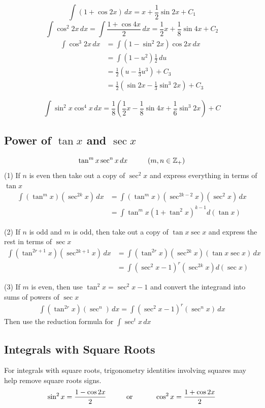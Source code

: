 \documentclass[12pt]{article}
\newcommand\tab[1][1cm]{\hspace*{#1}}
\begin{document}
\[
    \int (1 + \cos 2x) \, dx = x + \frac{1}{2} \sin 2x + C_1
\]
\[
    \int \cos^2 2x \, dx = \int \frac{1 + \cos 4x}{2} \, dx = \frac{1}{2}x + \frac{1}{8} \sin 4x + C_2 
\]
\begin{align*} 
    \int \cos^3 2x \, dx &= \int (1 - \sin^2 2x) \cos 2x \, dx \\
    &= \int (1 - u^2) \frac{1}{2} \, du \\
    &= \frac{1}{2} (u - \frac{1}{3}u^3) + C_3 \\
    &= \frac{1}{2} \left( \sin 2x - \frac{1}{3} \sin^3 2x \right) + C_3
\end{align*}

\[
    \int \sin^2 x \cos^4 x \, dx = \frac{1}{8} \left( \frac{1}{2}x - \frac{1}{8} \sin 4x + \frac{1}{6} \sin^3 2x \right) + C
\]

\subsection{Power of $\tan x$ and $\sec x$}
\[
    \tan^m x \sec^n x \, dx \textrm{\tab} (m, n \in \mathbb{Z}_{+})
\]
(1) If $n$ is even then take out a copy of $\sec^2 x$ and express everything in terms of $\tan x$
\begin{align*} 
    \int (\tan^m x)(\sec^{2k} x) \, dx &= \int (\tan^m x)(\sec^{2k - 2} x)(\sec^2 x) \, dx \\
    &= \int \tan^m x (1 + \tan^2 x)^{k - 1} d(\tan x)
\end{align*}

\noindent
(2) If $n$ is odd and $m$ is odd, then take out a copy of $\tan x \sec x$ and express the rest in terms of $\sec x$
\begin{align*} 
     \int (\tan^{2r + 1} x)(\sec^{2k + 1} x) \, dx &= \int (\tan^{2r} x)(\sec^{2k} x)(\tan x \sec x) \, dx \\ 
     &= \int (\sec^2 x - 1)^r (\sec^{2k} x) d(\sec x)
\end{align*}

\noindent
(3) If $m$ is even, then use $\tan^2 x = \sec^2 x - 1$ and convert the integrand into sums of powers of $\sec x$
\begin{align*} 
    \int (\tan^{2r} x)(\sec^n ) \, dx = \int (\sec^2 x - 1)^r (\sec^n x) \, dx
\end{align*}
Then use the reduction formula for $\int \sec^t x \, dx$

\subsection{Integrals with Square Roots}
For integrals with square roots, trigonometry identities involving squares may help remove square roots signs. 
\[
    \sin^2 x = \frac{1 - \cos 2x}{2} \textrm{\tab or \tab} \cos^2 x = \frac{1 + \cos 2x}{2} 
\]
\end{document}

